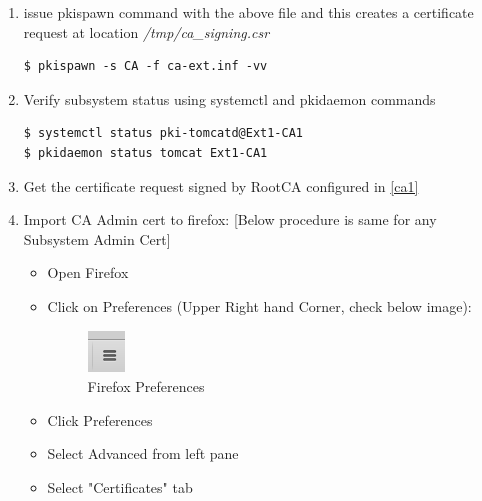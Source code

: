 \documentclass[a4paper]{article}
\begin{document}
\begin{enumerate}[label*=\arabic*.]
\begin{enumerate}[label*=\arabic*.]
\begin{lstlisting}[style=configFile]
[CA]
pki_external=True
pki_external_csr_path=/tmp/ca_signing.csr
pki_ca_signing_subject_dn=cn=CA Signing, ou=External,o=example.org
pki_ds_hostname=pki1.example.org
pki_ds_ldap_port=2389
pki_ds_password=Secret123
pki_ds_secure_connection=False
                        \end{lstlisting}
                    \item \label{ca3.2} issue pkispawn command with the above file and this creates a certificate request at location \textit{/tmp/ca\_signing.csr}
                        \begin{lstlisting}[style=bashInputStyle]
$ pkispawn -s CA -f ca-ext.inf -vv
                        \end{lstlisting}
                    \item Verify subsystem status using systemctl and pkidaemon commands
                    \begin{lstlisting}[style=bashInputStyle]
$ systemctl status pki-tomcatd@Ext1-CA1
$ pkidaemon status tomcat Ext1-CA1
                    \end{lstlisting}
                    \item Get the certificate request signed by RootCA configured in \ref{ca1}
                    \item \label{import_admin_p12} Import CA Admin cert to firefox: [Below procedure is same for any Subsystem Admin Cert]
                        \begin{itemize}
                            \item Open Firefox
                            \item Click on Preferences (Upper Right hand Corner, check below image):
                                \begin{figure}[H]
                                    \centering
                                    \includegraphics[width=10mm]{firefox-certificates1.png}
                                    \caption{Firefox Preferences}
                                \end{figure}
                            \item Click Preferences
                            \item Select Advanced from left pane
                            \item Select "Certificates" tab

\end{itemize}
\end{enumerate}
\end{enumerate}
\end{document}
